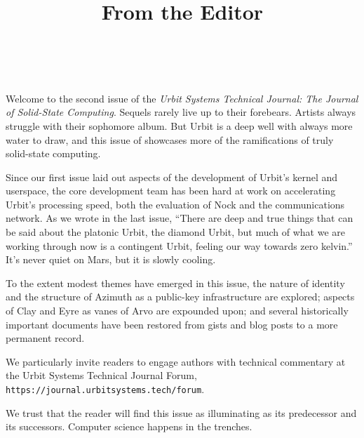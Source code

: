\documentclass[twoside]{article}
\title{From the Editor}
\author{\authorname~\authorpatp \\ \affiliation}
\date{}
\begin{document}
\thispagestyle{firststyle}

\setcounter{page}{1}

Welcome to the second issue of the \emph{Urbit Systems Technical Journal:  The Journal of Solid-State Computing}.  Sequels rarely live up to their forebears.  Artists always struggle with their sophomore album.  But Urbit is a deep well with always more water to draw, and this issue of  showcases more of the ramifications of truly solid-state computing.

Since our first issue laid out aspects of the development of Urbit's kernel and userspace, the core development team has been hard at work on accelerating Urbit's processing speed, both the evaluation of Nock and the communications network.  As we wrote in the last issue, ``There are deep and true things that can be said about the platonic Urbit, the diamond Urbit, but much of what we are working through now is a contingent Urbit, feeling our way towards zero kelvin.''  It's never quiet on Mars, but it is slowly cooling.

To the extent modest themes have emerged in this issue, the nature of identity and the structure of Azimuth as a public-key infrastructure are explored; aspects of Clay and Eyre as vanes of Arvo are expounded upon; and several historically important documents have been restored from gists and blog posts to a more permanent record.

\sloppy
We particularly invite readers to engage authors with technical commentary at the Urbit Systems Technical Journal \mbox{Forum}, \texttt{https://journal.urbitsystems.tech/forum}.

We trust that the reader will find this issue as illuminating as its predecessor and its successors.  Computer science happens in the trenches.  \tombstone{}
\end{document}
